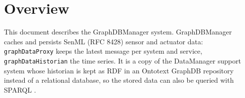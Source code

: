 \documentclass[a4paper]{arrowhead}
\begin{document}
\sloppy

\ArrowheadSetup

\begin{center}
  \vspace*{1cm}
  \huge{\arrowtitle}

  \vspace*{0.2cm}
  \LARGE{\arrowtype}
  \vspace*{1cm}

  \vspace*{\fill}


  \vspace*{1cm}
  \vspace*{\fill}

  \begin{abstract}
    This document describes the GraphDBManager support system of the Eclipse Arrowhead 5.2.2 framework, as implemented in \texttt{ah5-GraphDBManager-java-spring} of the primary Java source tree (\texttt{Eclipse-Arrowhead-java}) and deployed with the standalone Compose definition of that folder.
  \end{abstract}

  \vspace*{1cm}
\end{center}

\newpage

\tableofcontents
\newpage

\section{Overview}
\label{sec:overview}

This document describes the GraphDBManager system. GraphDBManager caches and persists SenML (RFC 8428) sensor and actuator data: \texttt{graphDataProxy} keeps the latest message per system and service, \texttt{graphDataHistorian} the time series. It is a copy of the DataManager support system \cite{dm-sysd-ref} whose historian is kept as RDF \cite{rdf11} in an Ontotext GraphDB repository \cite{graphdb} instead of a relational database, so the stored data can also be queried with SPARQL \cite{sparql11}.
\end{document}
